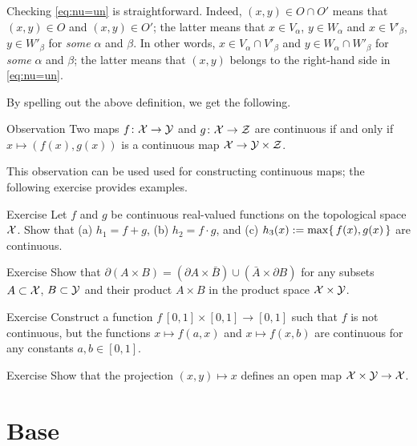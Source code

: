 Checking  \ref{eq:nu=un} is straightforward.
Indeed, $(x,y)\in O\cap O'$ means that $(x,y)\in O$ and $(x,y)\in O'$;
the latter means that $x\in V_\alpha$, $y\in W_\alpha$ and $x\in V'_\beta$, $y\in W'_\beta$ for \textit{some} $\alpha$ and $\beta$.
In other words, $x\in V_\alpha\cap V'_\beta$ and $y\in W_\alpha\cap W'_\beta$ for \textit{some} $\alpha$ and $\beta$;
the latter means that $(x,y)$ belongs to the right-hand side in \ref{eq:nu=un}.
\qeds

By spelling out the above definition, we get the following.

\begin{thm}{Observation}
Two maps $f\colon\mathcal{X}\to\mathcal{Y}$ and $g\colon\mathcal{X}\to\mathcal{Z}$ are continuous if and only if
$x\mapsto (f(x),g(x))$ is a continuous map $\mathcal{X}\to\mathcal{Y}\times \mathcal{Z}$.
\end{thm}

This observation can be used used for constructing continuous maps; the following exercise provides examples.

\begin{thm}{Exercise}\label{ex:cont-product-constr}
Let $f$ and $g$ be continuous real-valued functions on the topological space $\mathcal{X}$.
Show that (a) $h_1=f+g$, (b) $h_2=f\cdot g$, and (c) $h_3(x)\mathrel{:=}\max\{\,f(x), g(x)\,\}$ are continuous.

\end{thm}

\begin{thm}{Exercise}\label{ex:bryAxB}
Show that
$\partial (A\times B)=(\partial A\times \bar B)\cup(\bar A\times \partial B)$
for any subsets $A\subset\mathcal{X}$, $B\subset\mathcal{Y}$ and their product $A\times B$ in the product space $\mathcal{X}\times \mathcal{Y}$.
\end{thm}

\begin{thm}{Exercise}\label{ex:cont-product}
Construct a function $f\:[0,1]\times [0,1]\to [0,1]$ such that $f$ is not continuous, but the functions
$x\mapsto f(a,x)$ and $x\mapsto f(x,b)$ are continuous for any constants $a,b\in [0,1]$.
\end{thm}

\begin{thm}{Exercise}\label{ex:open-projection}
Show that the projection $(x,y)\mapsto x$ defines an open map $\mathcal{X}\times\mathcal{Y}\to \mathcal{X}$.
\end{thm}


\section{Base}

